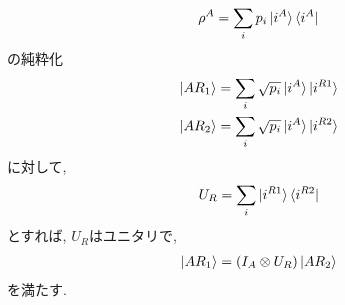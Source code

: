\begin{ex}
    \label{ex2.81}
    \begin{align*}
        \rho^A = \sum_i p_i \ket{i^A} \bra{i^A}
    \end{align*}
    の純粋化
    \begin{align*}
        \ket{AR_1} = \sum_i \sqrt{p_i} \ket{i^A} \ket{i^{R1}} \\
        \ket{AR_2} = \sum_i \sqrt{p_i} \ket{i^A} \ket{i^{R2}}
    \end{align*}
    に対して,
    \begin{align*}
        U_R = \sum_i \ket{i^{R1}} \bra{i^{R2}}
    \end{align*}
    とすれば, $U_R$はユニタリで,
    \begin{align*}
        \ket{A R_1} = (I_A \otimes U_R) \ket{A R_2}
    \end{align*}
    を満たす.
\end{ex}

